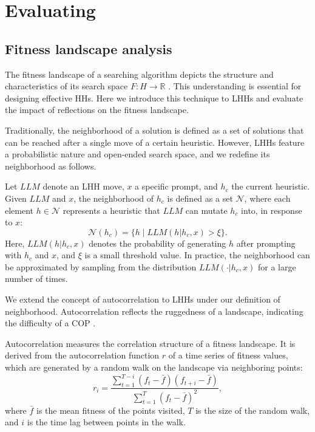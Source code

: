 \section{Evaluating \our{}}\label{sec: evaluating reevo}

\subsection{Fitness landscape analysis}\label{sec: fitness landscape analysis}

The fitness landscape of a searching algorithm depicts the structure and characteristics of its search space \( F: H \rightarrow \mathbb{R} \) \cite{ochoa2009analyzing_graph_hh_landscape}. This understanding is essential for designing effective HHs. Here we introduce this technique to LHHs and evaluate the impact of reflections on the fitness landscape.

Traditionally, the neighborhood of a solution is defined as a set of solutions that can be reached after a single move of a certain heuristic. However, LHHs feature a probabilistic nature and open-ended search space, and we redefine its neighborhood as follows.


\begin{definition}[Neighborhood]
    Let $LLM$ denote an LHH move, $x$ a specific prompt, and $h_c$ the current heuristic. Given \(LLM \) and \(x\), the neighborhood of \(h_c \) is defined as a set $\mathcal{N}$, where each element $h \in \mathcal{N}$ represents a heuristic that $LLM$ can mutate $h_{c}$ into, in response to $x$:
    \begin{equation}
     \mathcal{N}(h_c) = \{ h \mid LLM(h | h_c, x) > \xi \}.
    \end{equation}
     Here, $LLM(h | h_c, x) $ denotes the probability of generating $ h $ after prompting with $ h_c $ and $ x $, and $ \xi $ is a small threshold value. In practice, the neighborhood can be approximated by sampling from the distribution $LLM(\cdot | h_c, x)$ for a large number of times.
\end{definition}

We extend the concept of autocorrelation to LHHs under our definition of neighborhood. 
Autocorrelation reflects the ruggedness of a landscape, indicating the difficulty of a COP \cite{ochoa2009analyzing_graph_hh_landscape, hordijk1996measure_of_landscapes}. 




\begin{definition}[Autocorrelation]
    Autocorrelation measures the correlation structure of a fitness landscape. It is derived from the autocorrelation function \( r \) of a time series of fitness values, which are generated by a random walk on the landscape via neighboring points:
    \begin{equation}
         r_i = \frac{\sum_{t=1}^{T-i} (f_t - \bar{f})(f_{t+i} - \bar{f})}{\sum_{t=1}^{T} (f_t - \bar{f})^2},
    \end{equation}
    where \( \bar{f} \) is the mean fitness of the points visited, \( T \) is the size of the random walk, and \( i \) is the time lag between points in the walk.
\end{definition}

